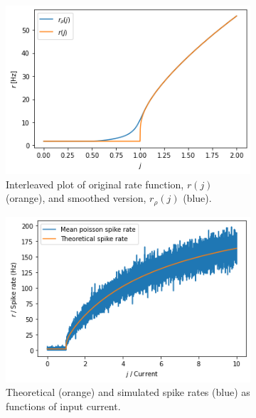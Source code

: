 \documentclass[a4paper,11pt]{article} %
\begin{document}
\begin{figure}
  \hfill
  \begin{subfigure}[t]{0.32\textwidth}
    \centering
    \includegraphics[width=\textwidth]{graphics/smooth-rate.png}
    \caption{Interleaved plot of original rate function, $r(j)$ (orange), and smoothed version, $r_\rho(j)$ (blue).} 
    \label{fig:rate-function}
  \end{subfigure}
  \hfill
  \begin{subfigure}[t]{0.32\textwidth}
    \centering
    \includegraphics[width=\textwidth]{graphics/poisson.png}
    \caption{Theoretical (orange) and simulated spike rates (blue) as functions of input current.}
    \label{fig:poisson-rate}
  \end{subfigure}
  \hfill
  \begin{subfigure}[t]{0.32\textwidth}
    \centering

\end{subfigure}
\end{figure}
\end{document}
